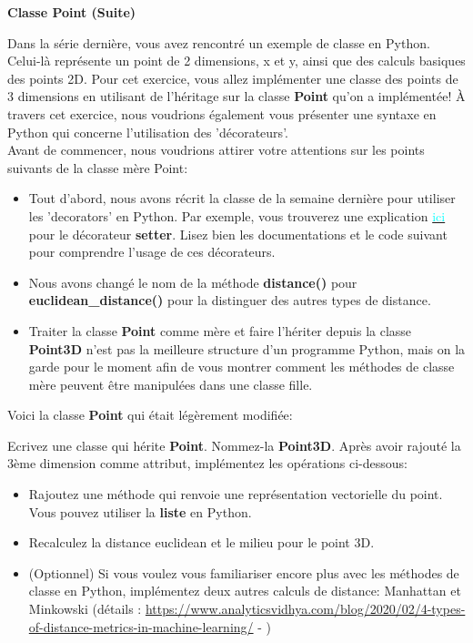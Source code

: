 \begin{Exercice}[10 minutes]\textbf{Classe Point (Suite)}

Dans la série dernière, vous avez rencontré un exemple de classe en Python. Celui-là représente un point de 2 dimensions, x et y, ainsi que des calculs basiques des points 2D. Pour cet exercice, vous allez implémenter une classe des points de 3 dimensions en utilisant de l'héritage sur la classe \textbf{Point} qu'on a implémentée! À travers cet exercice, nous voudrions également vous présenter une syntaxe en Python qui concerne l'utilisation des 'décorateurs'.\\


Avant de commencer, nous voudrions attirer votre attentions sur les points suivants de la classe mère Point:
\begin{itemize}
    \item Tout d'abord, nous avons récrit la classe de la semaine dernière pour utiliser les 'decorators' en Python. Par exemple, vous trouverez une explication \href{https://python-reference.readthedocs.io/en/latest/docs/property/setter.html}{\textcolor{cyan}{ici}} pour le décorateur \textbf{setter}. Lisez bien les documentations et le code suivant pour comprendre l'usage de ces décorateurs.
    \item Nous avons changé le nom de la méthode \textbf{distance()} pour \textbf{euclidean\_distance()} pour la distinguer des autres types de distance. 
    \item Traiter la classe \textbf{Point} comme mère et faire l'hériter depuis la classe \textbf{Point3D} n'est pas la meilleure structure d'un programme Python, mais on la garde pour le moment afin de vous montrer comment les méthodes de classe mère peuvent être manipulées dans une classe fille.
\end{itemize}

Voici la classe \textbf{Point} qui était légèrement modifiée:
 

Ecrivez une classe qui hérite \textbf{Point}. Nommez-la \textbf{Point3D}. Après avoir rajouté la 3ème dimension comme attribut, implémentez les opérations ci-dessous:

\begin{itemize}
    \item Rajoutez une méthode qui renvoie une représentation vectorielle du point. Vous pouvez utiliser la \textbf{liste} en Python.
    \item Recalculez la distance euclidean et le milieu pour le point 3D.
	\item (Optionnel) Si vous voulez vous familiariser encore plus avec les méthodes de classe en Python, implémentez deux autres calculs de distance: Manhattan et Minkowski (détails : \url{https://www.analyticsvidhya.com/blog/2020/02/4-types-of-distance-metrics-in-machine-learning/} - %
	)
\end{itemize}
 


\end{Exercice}

